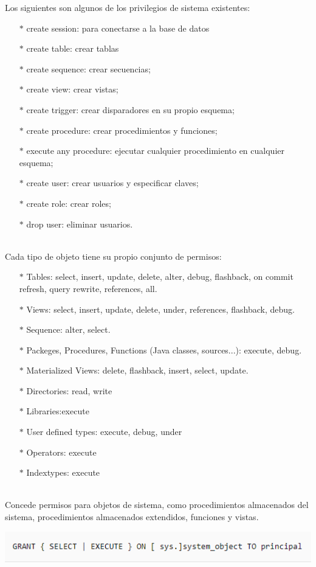 Los siguientes son algunos de los privilegios de sistema existentes:
	\begin{itemize}
		\item[$*$] create session: para conectarse a la base de datos
		\item[$*$] create table: crear tablas
		\item[$*$] create sequence: crear secuencias;
		\item[$*$] create view: crear vistas;
		\item[$*$] create trigger: crear disparadores en su propio esquema;
		\item[$*$] create procedure: crear procedimientos y funciones;
		\item[$*$] execute any procedure: ejecutar cualquier procedimiento en cualquier esquema;
		\item[$*$] create user: crear usuarios y especificar claves;
		\item[$*$] create role: crear roles;
		\item[$*$] drop user: eliminar usuarios.\\
\\
	\end{itemize}
Cada tipo de objeto tiene su propio conjunto de permisos:
	\begin{itemize}
		\item[$*$] Tables: select, insert, update, delete, alter, debug, flashback, on commit refresh, query rewrite, references, all.
		\item[$*$] Views: select, insert, update, delete, under, references, flashback, debug.
		\item[$*$] Sequence: alter, select.
		\item[$*$] Packeges, Procedures, Functions (Java classes, sources...): execute, debug.
		\item[$*$] Materialized Views: delete, flashback, insert, select, update.
		\item[$*$] Directories: read, write
		\item[$*$] Libraries:execute
		\item[$*$] User defined types: execute, debug, under
		\item[$*$] Operators: execute
		\item[$*$] Indextypes: execute\\
\\
	\end{itemize}
Concede permisos para objetos de sistema, como procedimientos almacenados del sistema, procedimientos almacenados extendidos, funciones y vistas.
\begin{center}
	\includegraphics[width=17.5cm]{./Imagenes/3} 
\end{center}

